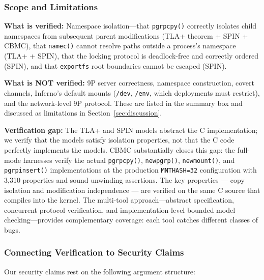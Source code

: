 \documentclass{article}
\begin{document}
\subsubsection{Scope and Limitations}

\textbf{What is verified:} Namespace isolation---that \texttt{pgrpcpy()} correctly
isolates child namespaces from subsequent parent modifications (TLA+ theorem +
SPIN + CBMC), that \texttt{namec()} cannot resolve paths outside a process's namespace
(TLA+ + SPIN), that the locking protocol is deadlock-free and correctly ordered (SPIN),
and that \texttt{exportfs} root boundaries cannot be escaped (SPIN).

\textbf{What is NOT verified:} 9P server correctness, namespace construction, covert channels, Inferno's default mounts (\texttt{/dev}, \texttt{/env}, which deployments must restrict), and the network-level 9P protocol. These are listed in the summary box and discussed as limitations in Section~\ref{sec:discussion}.

\textbf{Verification gap:} The TLA+ and SPIN models abstract the C implementation;
we verify that the models satisfy isolation properties, not that the C code perfectly
implements the models. CBMC substantially closes this gap: the full-mode harnesses
verify the actual \texttt{pgrpcpy()}, \texttt{newpgrp()}, \texttt{newmount()}, and
\texttt{pgrpinsert()} implementations at the production \texttt{MNTHASH=32}
configuration with 3,310 properties and sound unwinding assertions. The key properties
--- copy isolation and modification independence --- are verified on the same C source
that compiles into the kernel. The multi-tool approach---abstract specification,
concurrent protocol verification, and implementation-level bounded model checking---provides
complementary coverage: each tool catches different classes of bugs.

\subsubsection{Connecting Verification to Security Claims}

Our security claims rest on the following argument structure:
\end{document}
